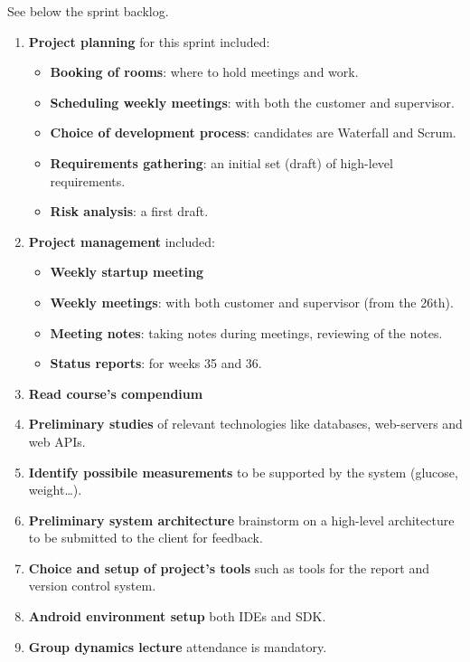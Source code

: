 See below the sprint backlog.
\begin{enumerate}[1.]
	\item \textbf{Project planning} for this sprint included:
		\begin{itemize}
			\item \textbf{Booking of rooms}:
				where to hold meetings and work.
			\item \textbf{Scheduling weekly meetings}:
				with both the customer and supervisor.
			\item \textbf{Choice of development process}:
				candidates are Waterfall and Scrum.
			\item \textbf{Requirements gathering}:
				an initial set (draft) of high-level requirements.
			\item \textbf{Risk analysis}:
				a first draft.
		\end{itemize}
	\item \textbf{Project management} included:
		\begin{itemize}
			\item \textbf{Weekly startup meeting}
			\item \textbf{Weekly meetings}:
				with both customer and supervisor (from the 26th).
			\item \textbf{Meeting notes}:
				taking notes during meetings, reviewing of the notes.
			\item \textbf{Status reports}:
				for weeks 35 and 36.
		\end{itemize}
	\item \textbf{Read course's compendium}
	\item \textbf{Preliminary studies}\newline
		of relevant technologies like databases, web-servers and web APIs.
	\item \textbf{Identify possibile measurements}\newline
		to be supported by the system (glucose, weight\ldots).
	\item \textbf{Preliminary system architecture}\newline
		brainstorm on a high-level architecture to be submitted to the client for feedback.
	\item \textbf{Choice and setup of project's tools}\newline
		such as tools for the report and version control system.
	\item \textbf{Android environment setup}\newline
		both IDEs and SDK.
	\item \textbf{Group dynamics lecture}\newline
		attendance is mandatory.
\end{enumerate}


